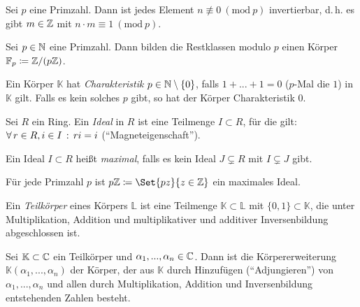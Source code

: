 \documentclass{cheat-sheet}
\newcommand{\K}{\mathbb{K}} %
\newcommand{\Mod}[1]{\ (\text{mod}\ #1)} %
\newcommand{\F}{\mathbb{F}} %
\renewcommand{\L}{\mathbb{L}} %
\begin{document}

\begin{lem}
  Sei $p$ eine Primzahl. Dann ist jedes Element $n \not\equiv 0 \Mod{p}$ invertierbar, d.\,h. es gibt $m \in \mathbb{Z}$ mit $n \cdot m \equiv 1 \Mod{p}$.
\end{lem}

\begin{defn}
  Sei $p \in \mathbb{N}$ eine Primzahl. Dann bilden die Restklassen modulo $p$ einen Körper $\F_p \coloneqq \Z / (p \Z)$.
\end{defn}

\begin{defn}
  Ein Körper $\K$ hat \emph{Charakteristik} $p \in \mathbb{N} \setminus \{ 0 \}$, falls $1 + ... + 1 = 0$ ($p$-Mal die $1$) in $\K$ gilt. Falls es kein solches $p$ gibt, so hat der Körper Charakteristik $0$.
\end{defn}

\begin{defn}
  Sei $R$ ein Ring. Ein \emph{Ideal} in $R$ ist eine Teilmenge $I \subset R$, für die gilt: $\forall \, {r \in R, i \in I} \,:\, ri = i$ ("`Magneteigenschaft"').
\end{defn}

\begin{defn}
  Ein Ideal $I \subset R$ heißt \emph{maximal}, falls es kein Ideal $J \subsetneq R$ mit $I \subsetneq J$ gibt.
\end{defn}

\begin{bem}
  Für jede Primzahl $p$ ist $p \Z \coloneqq \Set{ pz }{ z \in \Z }$ ein maximales Ideal.
\end{bem}


\begin{defn}
  Ein \emph{Teilkörper} eines Körpers $\L$ ist eine Teilmenge $\K \subset \L$ mit $\{ 0, 1 \} \subset \K$, die unter Multiplikation, Addition und multiplikativer und additiver Inversenbildung abgeschlossen ist.
\end{defn}

\begin{defn}
  Sei $\K \subset \C$ ein Teilkörper und $\alpha_1, ..., \alpha_n \in \mathbb{C}$. Dann ist die Körpererweiterung $\K(\alpha_1, ..., \alpha_n)$ der Körper, der aus $\K$ durch Hinzufügen ("`Adjungieren"') von $\alpha_1, ..., \alpha_n$ und allen durch Multiplikation, Addition und Inversenbildung entstehenden Zahlen besteht.
\end{defn}
\end{document}

